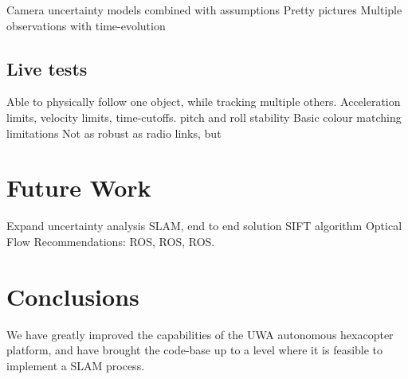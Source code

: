 \documentclass[a4paper, 11pt, titlepage]{article}
\begin{document}
    Camera uncertainty models combined with assumptions
    Pretty pictures
      Multiple observations with time-evolution

  \subsection{Live tests}
    Able to physically follow one object, while tracking multiple others.
    Acceleration limits, velocity limits, time-cutoffs.
    pitch and roll stability
    Basic colour matching limitations
    Not as robust as radio links, but 

\section{Future Work}
  Expand uncertainty analysis
  SLAM, end to end solution
  SIFT algorithm
  Optical Flow
  Recommendations:
    ROS, ROS, ROS.

\section{Conclusions}
  We have greatly improved the capabilities of the UWA autonomous hexacopter platform, and have brought the code-base up to a level where it is feasible to implement a SLAM process.





\renewcommand{\refname}{References}


%


\begin{appendices}
%    

\end{appendices}

  
\end{document}
